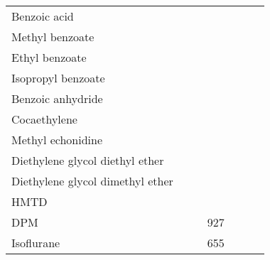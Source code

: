 \begin{landscape}
\begin{longtable}[c]{@{}lcccccc@{}}
Benzoic acid         &                  &                     &                              &                               &                          &                  \\
Methyl benzoate      &                  &                     &                              &                               &                          &                  \\
Ethyl benzoate       &                  &                     &                              &                               &                          &                  \\
Isopropyl benzoate   &                  &                     &                              &                               &                          &                  \\
Benzoic anhydride    &                  &                     &                              &                               &                          &                  \\
Cocaethylene         &                  &                     &                              &                               &                          &                  \\
Methyl echonidine    &                  &                     &                              &                               &                          &                  \\
Diethylene glycol  diethyl ether  &                  &                     &                              &                               &                          &                  \\
Diethylene glycol  dimethyl ether  &                  &                     &                              &                               &                          &                  \\
HMTD                 &                  &                     &                              &                               &                          &                  \\
DPM                  &                  &                     &927                               &                               &                          &                  \\
Isoflurane           &                  &                     &655                               &                               &                          &                  \\

\end{longtable}
\end{landscape}
